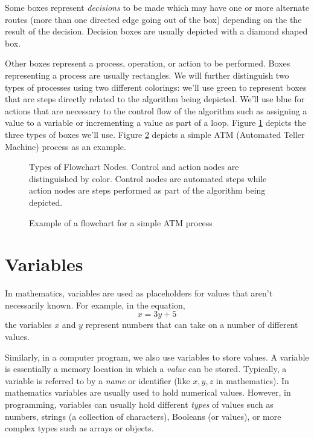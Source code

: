 Some boxes represent \emph{decisions} to be made which may have one or
more alternate routes (more than one directed edge going out of the box)
depending on the the result of the decision.  Decision boxes are usually 
depicted with a diamond shaped box.

Other boxes represent a process, operation, or action to be performed.  Boxes
representing a process are usually rectangles.  We will further distinguish two
types of processes using two different colorings: we'll use green to represent
boxes that are steps directly related to the algorithm being depicted.  We'll
use blue for actions that are necessary to the control flow of the algorithm such
as assigning a value to a variable or incrementing a value as part of a loop.
Figure \ref{figure:flowchartNodes} depicts the three types of boxes we'll use.  
Figure \ref{figure:flowchartATM} depicts a simple ATM (Automated Teller Machine) process 
as an example.

\begin{figure}
\centering
{}
\caption[Types of Flowchart Nodes]{Types of Flowchart Nodes.  Control and 
action nodes are distinguished by color.  Control nodes are automated steps
while action nodes are steps performed as part of the algorithm being depicted.}
\label{figure:flowchartNodes}
\end{figure}

\begin{figure}
\centering

\caption{Example of a flowchart for a simple ATM process}
\label{figure:flowchartATM}
\end{figure}

\section{Variables}

In mathematics, variables are used as placeholders for values that aren't
necessarily known.  For example, in the equation, 
  $$x = 3y + 5$$ 
the variables $x$ and $y$ represent numbers that can take on a number 
of different values.

Similarly, in a computer program, we also use \glspl{variable} to store 
values.  A variable is essentially a memory location in which a \emph{value} 
can be stored.  Typically, a variable is referred to by a \emph{name} 
or \gls{identifier} (like $x, y, z$ in mathematics).  In mathematics variables
are usually used to hold numerical values.  However, in programming, 
variables can usually hold different \emph{types} of values such as numbers,
strings (a collection of characters), Booleans (\True or \False values), or
more complex types such as arrays or objects.

